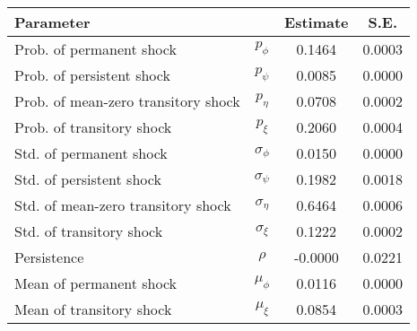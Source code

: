 \begin{tabular}{lccc} 
\toprule 
Parameter & & Estimate & S.E. \\ 
\midrule 
Prob. of permanent shock & $p_{\phi}$ &  0.1464 &  0.0003 \\ 
Prob. of persistent shock & $p_{\psi}$ &  0.0085 &  0.0000 \\ 
Prob. of mean-zero transitory shock & $p_{\eta}$ &  0.0708 &  0.0002 \\ 
Prob. of transitory shock & $p_{\xi}$ &  0.2060 &  0.0004 \\ 
Std. of permanent shock & $\sigma_{\phi}$ &  0.0150 &  0.0000 \\ 
Std. of persistent shock & $\sigma_{\psi}$ &  0.1982 &  0.0018 \\ 
Std. of mean-zero transitory shock & $\sigma_{\eta}$ &  0.6464 &  0.0006 \\ 
Std. of transitory shock & $\sigma_{\xi}$ &  0.1222 &  0.0002 \\ 
Persistence & $\rho$ & -0.0000 &  0.0221 \\ 
Mean of permanent shock & $\mu_{\phi}$ &  0.0116 &  0.0000 \\ 
Mean of transitory shock & $\mu_{\xi}$ &  0.0854 &  0.0003 \\ 
\bottomrule
\end{tabular}
